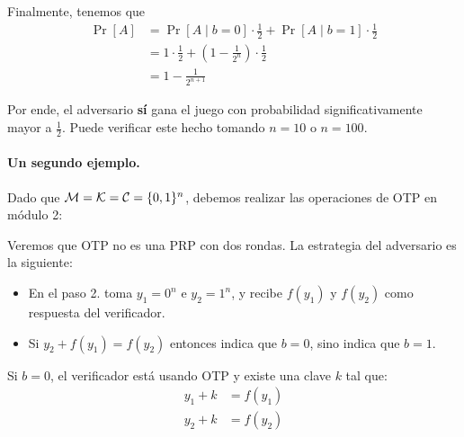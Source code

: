 Finalmente, tenemos que
\begin{align*}
    \Pr[A] & = \Pr[A \mid b = 0] \cdot \frac{1}{2} + \Pr[A \mid b = 1] \cdot \frac{1}{2} \\
           & = 1 \cdot \frac{1}{2} + \left(1 - \frac{1}{2^n}\right) \cdot \frac{1}{2}    \\
           & = 1 - \frac{1}{2^{n+1}}
\end{align*}

Por ende, el adversario \textbf{sí} gana el juego con probabilidad significativamente mayor a $\frac{1}{2}$. Puede verificar este hecho tomando $n = 10$ o $n = 100$.

\paragraph{Un segundo ejemplo.} Dado que $\mathcal{M} = \mathcal{K} = \mathcal{C} = \{0,1\}^n$, debemos realizar las operaciones de OTP en módulo 2:

Veremos que OTP no es una PRP con dos rondas. La estrategia del adversario es la siguiente:
\begin{itemize}
    \item En el paso 2. toma $y_1 = 0^n$ e $y_2 = 1^n$, y recibe $f(y_1)$ y $f(y_2)$ como respuesta del verificador.
    \item Si $y_2 + f(y_1) = f(y_2)$ entonces indica que $b = 0$, sino indica que $b = 1$.
\end{itemize}

Si $b = 0$, el verificador está usando OTP y existe una clave $k$ tal que:
\begin{align*}
    y_1 + k &= f(y_1) \\
    y_2 + k &= f(y_2)
\end{align*}

